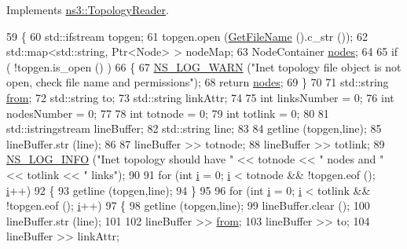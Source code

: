 Implements \hyperlink{classns3_1_1TopologyReader_ae2a69c10e0bb66d6c850a72c6655e69c}{ns3\+::\+Topology\+Reader}.


\begin{DoxyCode}
59 \{
60   std::ifstream topgen;
61   topgen.open (\hyperlink{classns3_1_1TopologyReader_a6d417b0d32aa613887596d769aee6c5d}{GetFileName} ().c\_str ());
62   std::map<std::string, Ptr<Node> > nodeMap;
63   NodeContainer \hyperlink{visualizer-ideas_8txt_a3e1b3808014a2c68ab0cd0182e041be2}{nodes};
64 
65   \textcolor{keywordflow}{if} ( !topgen.is\_open () )
66     \{
67       \hyperlink{group__logging_gade7208b4009cdf0e25783cd26766f559}{NS\_LOG\_WARN} (\textcolor{stringliteral}{"Inet topology file object is not open, check file name and permissions"});
68       \textcolor{keywordflow}{return} \hyperlink{visualizer-ideas_8txt_a3e1b3808014a2c68ab0cd0182e041be2}{nodes};
69     \}
70 
71   std::string \hyperlink{lte__amc_8m_a1b4c81ff74eb1a626b5ade44c81004b3}{from};
72   std::string to;
73   std::string linkAttr;
74 
75   \textcolor{keywordtype}{int} linksNumber = 0;
76   \textcolor{keywordtype}{int} nodesNumber = 0;
77 
78   \textcolor{keywordtype}{int} totnode = 0;
79   \textcolor{keywordtype}{int} totlink = 0;
80 
81   std::istringstream lineBuffer;
82   std::string line;
83 
84   getline (topgen,line);
85   lineBuffer.str (line);
86 
87   lineBuffer >> totnode;
88   lineBuffer >> totlink;
89   \hyperlink{group__logging_gafbd73ee2cf9f26b319f49086d8e860fb}{NS\_LOG\_INFO} (\textcolor{stringliteral}{"Inet topology should have "} << totnode << \textcolor{stringliteral}{" nodes and "} << totlink << \textcolor{stringliteral}{" links"});
90 
91   \textcolor{keywordflow}{for} (\textcolor{keywordtype}{int} \hyperlink{bernuolliDistribution_8m_a6f6ccfcf58b31cb6412107d9d5281426}{i} = 0; \hyperlink{bernuolliDistribution_8m_a6f6ccfcf58b31cb6412107d9d5281426}{i} < totnode && !topgen.eof (); \hyperlink{bernuolliDistribution_8m_a6f6ccfcf58b31cb6412107d9d5281426}{i}++)
92     \{
93       getline (topgen,line);
94     \}
95 
96   \textcolor{keywordflow}{for} (\textcolor{keywordtype}{int} \hyperlink{bernuolliDistribution_8m_a6f6ccfcf58b31cb6412107d9d5281426}{i} = 0; \hyperlink{bernuolliDistribution_8m_a6f6ccfcf58b31cb6412107d9d5281426}{i} < totlink && !topgen.eof (); \hyperlink{bernuolliDistribution_8m_a6f6ccfcf58b31cb6412107d9d5281426}{i}++)
97     \{
98       getline (topgen,line);
99       lineBuffer.clear ();
100       lineBuffer.str (line);
101 
102       lineBuffer >> \hyperlink{lte__amc_8m_a1b4c81ff74eb1a626b5ade44c81004b3}{from};
103       lineBuffer >> to;
104       lineBuffer >> linkAttr;

\end{DoxyCode}
